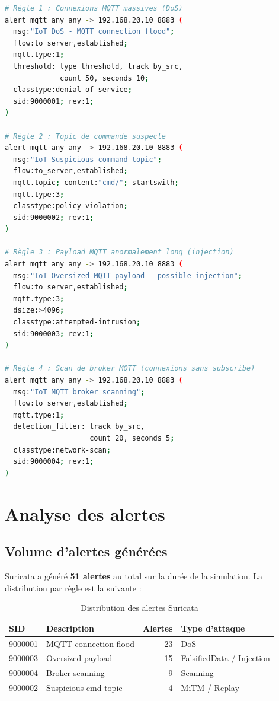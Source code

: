 \begin{lstlisting}[language=bash, caption=Règles Suricata pour la détection des attaques IoT/MQTT]
# Règle 1 : Connexions MQTT massives (DoS)
alert mqtt any any -> 192.168.20.10 8883 (
  msg:"IoT DoS - MQTT connection flood";
  flow:to_server,established;
  mqtt.type:1;
  threshold: type threshold, track by_src,
             count 50, seconds 10;
  classtype:denial-of-service;
  sid:9000001; rev:1;
)

# Règle 2 : Topic de commande suspecte
alert mqtt any any -> 192.168.20.10 8883 (
  msg:"IoT Suspicious command topic";
  flow:to_server,established;
  mqtt.topic; content:"cmd/"; startswith;
  mqtt.type:3;
  classtype:policy-violation;
  sid:9000002; rev:1;
)

# Règle 3 : Payload MQTT anormalement long (injection)
alert mqtt any any -> 192.168.20.10 8883 (
  msg:"IoT Oversized MQTT payload - possible injection";
  flow:to_server,established;
  mqtt.type:3;
  dsize:>4096;
  classtype:attempted-intrusion;
  sid:9000003; rev:1;
)

# Règle 4 : Scan de broker MQTT (connexions sans subscribe)
alert mqtt any any -> 192.168.20.10 8883 (
  msg:"IoT MQTT broker scanning";
  flow:to_server,established;
  mqtt.type:1;
  detection_filter: track by_src,
                    count 20, seconds 5;
  classtype:network-scan;
  sid:9000004; rev:1;
)
\end{lstlisting}

\section{Analyse des alertes}

\subsection{Volume d'alertes générées}

Suricata a généré \textbf{51 alertes} au total sur la durée de la simulation. La distribution par règle est la suivante :

\begin{table}[H]
\centering
\caption{Distribution des alertes Suricata}
\label{tab:suricata_alerts}
\begin{tabular}{llrl}
\toprule
\textbf{SID} & \textbf{Description} & \textbf{Alertes} & \textbf{Type d'attaque} \\
\midrule
9000001 & MQTT connection flood & 23 & DoS \\
9000003 & Oversized payload & 15 & FalsifiedData / Injection \\
9000004 & Broker scanning & 9 & Scanning \\
9000002 & Suspicious cmd topic & 4 & MiTM / Replay \\
\bottomrule
\end{tabular}
\end{table}

